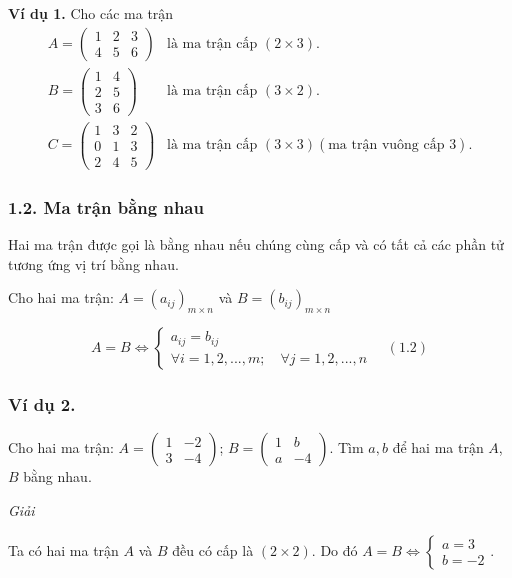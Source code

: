 \textbf{Ví dụ 1.} Cho các ma trận
\[
\begin{array}{ll}
A = \begin{pmatrix}
1 & 2 & 3 \\
4 & 5 & 6
\end{pmatrix} & \text{là ma trận cấp } (2 \times 3). \\
B = \begin{pmatrix}
1 & 4 \\
2 & 5 \\
3 & 6
\end{pmatrix} & \text{là ma trận cấp } (3 \times 2). \\
C = \begin{pmatrix}
1 & 3 & 2 \\
0 & 1 & 3 \\
2 & 4 & 5
\end{pmatrix} & \text{là ma trận cấp } (3 \times 3) (\text{ma trận vuông cấp } 3).
\end{array}
\]

\subsubsection*{1.2. Ma trận bằng nhau}
Hai ma trận được gọi là bằng nhau nếu chúng cùng cấp và có tất cả các phần tử tương ứng vị trí bằng nhau.

Cho hai ma trận: \( A = (a_{ij})_{m \times n} \) và \( B = (b_{ij})_{m \times n} \)

\[
A = B \Leftrightarrow \begin{cases}
a_{ij} = b_{ij} \\
\forall i = 1, 2, ..., m; \quad \forall j = 1, 2, ..., n
\end{cases} \quad (1.2)
\]
\subsubsection*{Ví dụ 2.}
Cho hai ma trận: \( A = \begin{pmatrix}
1 & -2 \\
3 & -4
\end{pmatrix} \);
\( B = \begin{pmatrix}
1 & b \\
a & -4
\end{pmatrix} \).
Tìm \( a, b \) để hai ma trận \( A \), \( B \) bằng nhau.

\textit{Giải}

Ta có hai ma trận \( A \) và \( B \) đều có cấp là \( (2 \times 2) \). Do đó \( A = B \Leftrightarrow \begin{cases}
a = 3 \\
b = -2
\end{cases} \).

